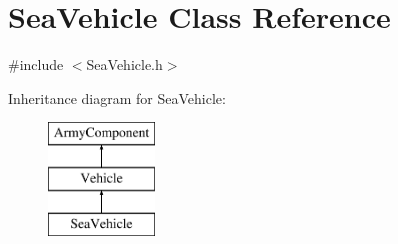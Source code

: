 \hypertarget{class_sea_vehicle}{}\section{Sea\+Vehicle Class Reference}
\label{class_sea_vehicle}


{\ttfamily \#include $<$Sea\+Vehicle.\+h$>$}

Inheritance diagram for Sea\+Vehicle\+:\begin{figure}[H]
\begin{center}
\leavevmode
\includegraphics[height=3.000000cm]{class_sea_vehicle}
\end{center}
\end{figure}
